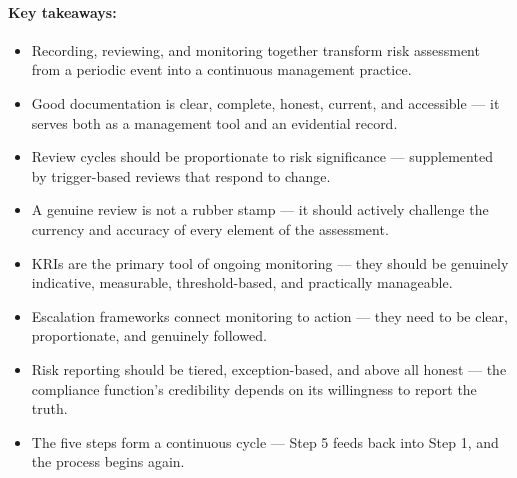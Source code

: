 \paragraph{Key takeaways:}
\begin{itemize}
  \item{Recording, reviewing, and monitoring together transform risk assessment from a periodic event into a continuous management practice.}
  \item{Good documentation is clear, complete, honest, current, and accessible — it serves both as a management tool and an evidential record.}
  \item{Review cycles should be proportionate to risk significance — supplemented by trigger-based reviews that respond to change.}
  \item{A genuine review is not a rubber stamp — it should actively challenge the currency and accuracy of every element of the assessment.}
  \item{KRIs are the primary tool of ongoing monitoring — they should be genuinely indicative, measurable, threshold-based, and practically manageable.}
  \item{Escalation frameworks connect monitoring to action — they need to be clear, proportionate, and genuinely followed.}
  \item{Risk reporting should be tiered, exception-based, and above all honest — the compliance function's credibility depends on its willingness to report the truth.}
  \item{The five steps form a continuous cycle — Step 5 feeds back into Step 1, and the process begins again.}
\end{itemize}

